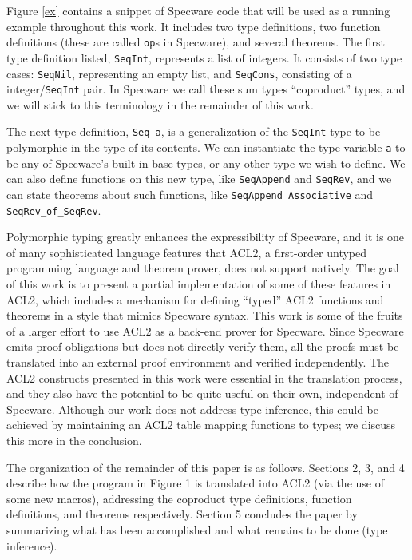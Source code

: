 \documentclass[]{eptcs}
\begin{document}
Figure \ref{ex} contains a snippet of Specware code that will be used as a running example throughout this work. It includes two type definitions, two function definitions (these are called \verb|op|s in Specware), and several theorems. The first type definition listed, \verb|SeqInt|, represents a list of integers. It consists of two type cases: \verb|SeqNil|, representing an empty list, and \verb|SeqCons|, consisting of a integer/\verb|SeqInt| pair. In Specware we call these sum types ``coproduct'' types, and we will stick to this terminology in the remainder of this work.

The next type definition, \verb|Seq a|, is a generalization of the \verb|SeqInt| type to be polymorphic in the type of its contents. We can instantiate the type variable \verb|a| to be any of Specware's built-in base types, or any other type we wish to define. We can also define functions on this new type, like \verb|SeqAppend| and \verb|SeqRev|, and we can state theorems about such functions, like \verb|SeqAppend_Associative| and \verb|SeqRev_of_SeqRev|.

Polymorphic typing greatly enhances the expressibility of Specware, and it is one of many sophisticated language features that ACL2, a first-order untyped programming language and theorem prover, does not support natively. The goal of this work is to present a partial implementation of some of these features in ACL2, which includes a mechanism for defining ``typed'' ACL2 functions and theorems in a style that mimics Specware syntax. This work is some of the fruits of a larger effort to use ACL2 as a back-end prover for Specware. Since Specware emits proof obligations but does not directly verify them, all the proofs must be translated into an external proof environment and verified independently. The ACL2 constructs presented in this work were essential in the translation process, and they also have the potential to be quite useful on their own, independent of Specware. Although our work does not address type inference, this could be achieved by maintaining an ACL2 table mapping functions to types; we discuss this more in the conclusion.

The organization of the remainder of this paper is as follows. Sections 2, 3, and 4 describe how the program in Figure 1 is translated into ACL2 (via the use of some new macros), addressing the coproduct type definitions, function definitions, and theorems respectively. Section 5 concludes the paper by summarizing what has been accomplished and what remains to be done (type inference).
\end{document}
